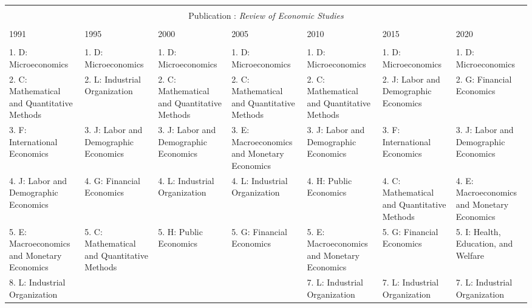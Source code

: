 \begin{table}[h]
\begin{tabular}{@{\extracolsep{5pt}} lllllll}
 
\hline \\[-1.8ex] \multicolumn{7}{c}{Publication : \textit{Review of Economic Studies}} \\
 \cline{1-7} \\
1991 & 1995 & 2000 & 2005 & 2010 & 2015 & 2020 \\ 
\hline \\[-1.8ex] 
1. D: Microeconomics & 1. D: Microeconomics & 1. D: Microeconomics & 1. D: Microeconomics & 1. D: Microeconomics & 1. D: Microeconomics & 1. D: Microeconomics \\ 
2. C: Mathematical and Quantitative Methods & 2. L: Industrial Organization & 2. C: Mathematical and Quantitative Methods & 2. C: Mathematical and Quantitative Methods & 2. C: Mathematical and Quantitative Methods & 2. J: Labor and Demographic Economics & 2. G: Financial Economics \\ 
3. F: International Economics & 3. J: Labor and Demographic Economics & 3. J: Labor and Demographic Economics & 3. E: Macroeconomics and Monetary Economics & 3. J: Labor and Demographic Economics & 3. F: International Economics & 3. J: Labor and Demographic Economics \\ 
4. J: Labor and Demographic Economics & 4. G: Financial Economics & 4. L: Industrial Organization & 4. L: Industrial Organization & 4. H: Public Economics & 4. C: Mathematical and Quantitative Methods & 4. E: Macroeconomics and Monetary Economics \\ 
5. E: Macroeconomics and Monetary Economics & 5. C: Mathematical and Quantitative Methods & 5. H: Public Economics & 5. G: Financial Economics & 5. E: Macroeconomics and Monetary Economics & 5. G: Financial Economics & 5. I: Health, Education, and Welfare \\ 
8. L: Industrial Organization &  &  &  & 7. L: Industrial Organization & 7. L: Industrial Organization & 7. L: Industrial Organization \\ 

\end{tabular} 
\end{table} 
